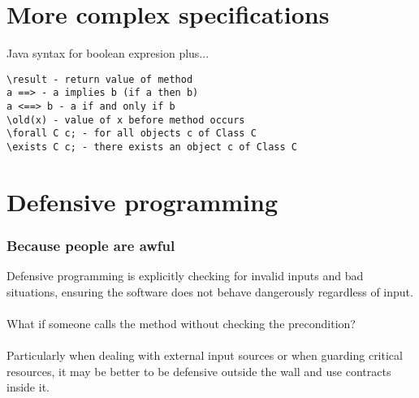\documentclass{article}
\theoremstyle{remark}
\theoremstyle{definition}
\begin{document}
\section*{More complex specifications}
Java syntax for boolean expresion plus...
\begin{lstlisting}
\result - return value of method
a ==> - a implies b (if a then b)
a <==> b - a if and only if b
\old(x) - value of x before method occurs
\forall C c; - for all objects c of Class C
\exists C c; - there exists an object c of Class C
\end{lstlisting}

\section*{Defensive programming}
\subsubsection*{Because people are awful}
Defensive programming is explicitly checking for invalid inputs and bad
situations, ensuring the software does not behave dangerously regardless of
input. 
\\\\
What if someone calls the method without checking the precondition?
\\\\
Particularly when dealing with external input sources or when guarding critical
resources, it may be better to be defensive outside the wall and use contracts
inside it.
\end{document}
